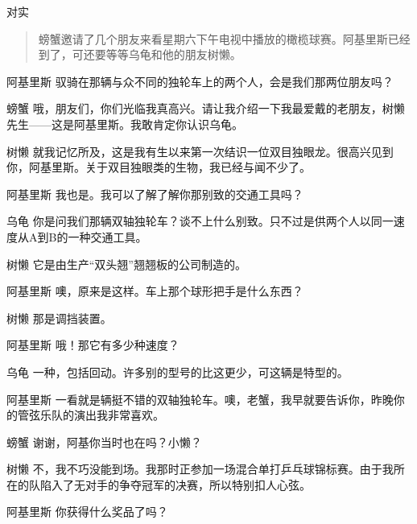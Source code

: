 
\begin{dialog}{对实}

\begin{quote}
螃蟹邀请了几个朋友来看星期六下午电视中播放的橄榄球赛。阿基里斯已经到了，可还要等等乌龟和他的朋友树懒。
\end{quote}

\begin{dialogue}

\item[阿基里斯]驭骑在那辆与众不同的独轮车上的两个人，会是我们那两位朋友吗？


\item[螃蟹]哦，朋友们，你们光临我真高兴。请让我介绍一下我最爱戴的老朋友，树懒先生——这是阿基里斯。我敢肯定你认识乌龟。

\item[树懒]就我记忆所及，这是我有生以来第一次结识一位双目独眼龙。很高兴见到你，阿基里斯。关于双目独眼类的生物，我已经与闻不少了。

\item[阿基里斯]我也是。我可以了解了解你那别致的交通工具吗？

\item[乌龟]你是问我们那辆双轴独轮车？谈不上什么别致。只不过是供两个人以同一速度从A到B的一种交通工具。

\item[树懒]它是由生产“双头翘”翘翘板的公司制造的。

\item[阿基里斯]噢，原来是这样。车上那个球形把手是什么东西？

\item[树懒]那是调挡装置。

\item[阿基里斯]哦！那它有多少种速度？

\item[乌龟]一种，包括回动。许多别的型号的比这更少，可这辆是特型的。

\item[阿基里斯]一看就是辆挺不错的双轴独轮车。噢，老蟹，我早就要告诉你，昨晚你的管弦乐队的演出我非常喜欢。

\item[螃蟹]谢谢，阿基你当时也在吗？小懒？

\item[树懒]不，我不巧没能到场。我那时正参加一场混合单打乒乓球锦标赛。由于我所在的队陷入了无对手的争夺冠军的决赛，所以特别扣人心弦。

\item[阿基里斯]你获得什么奖品了吗？


\end{dialogue}
\end{dialog}
